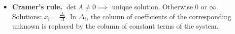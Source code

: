 \begin{itemize}
\begin{multline*}
\begin{array}{c c c}
    \end{array}
    \right| = a_{1}b_{2}c_{3} + a_{3}b_{1}c_{2} + a_{2}b_{3}c_{1} -\\- a_{3}b_{2}c_{1} - a_{1}b_{3}c_{2} - a_{2}b_{1}c_{3}
    \end{multline*}
    $\Delta = \sum_{j = 1}^{n} (-1)^{j + 1} \cdot a_{1, j} \cdot \bar{M_{j}^{1}}$, $\bar{M_{j}^{1}}$ --- determinant of the matrix obtained by deleting row $1$ and column $j$.
    \item \textbf{Cramer's rule.} $\det A \neq 0 \implies$ unique solution. Otherwise $0$ or $\infty$.
    Solutions: $\displaystyle x_{i} = \frac{\Delta_{i}}{\Delta}$. In $\Delta_{i}$, the column of coefficients of the corresponding unknown is replaced by the column of constant terms of the system.
\end{itemize}

